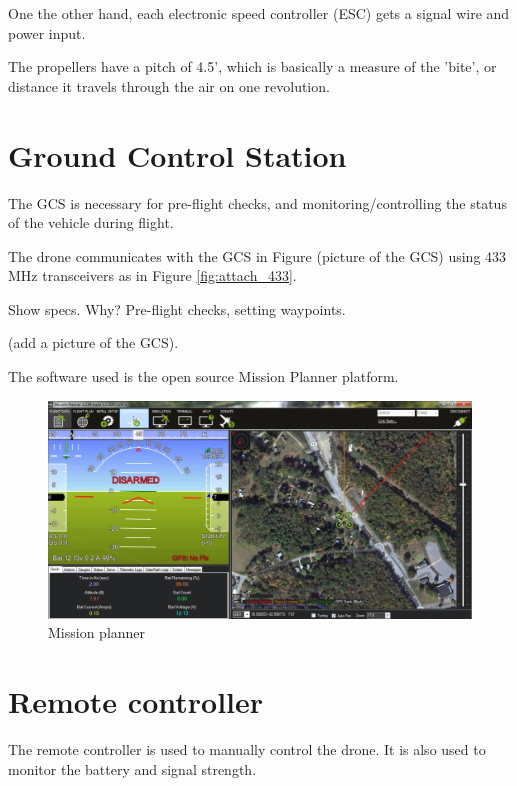 One the other hand, each electronic speed controller (ESC) gets a signal wire and power input.

The propellers have a pitch of 4.5', which is basically a measure of the 'bite', or distance it travels through the air on one revolution.

\section{Ground Control Station}

The GCS is necessary for pre-flight checks, and monitoring/controlling the status of the vehicle during flight.

The drone communicates with the GCS in Figure (picture of the GCS) using 433 MHz transceivers as in Figure \ref{fig:attach_433}.

Show specs. Why? Pre-flight checks, setting waypoints.

(add a picture of the GCS).

The software used is the open source Mission Planner platform.

\begin{figure}[H]
\centering
\includegraphics[scale=0.2]{images/mp.jpg}
\caption{Mission planner}
\label{fig:mission_planner}
\end{figure}

\section{Remote controller}
\label{sec:remote_controller}

The remote controller is used to manually control the drone. It is also used to monitor the battery and signal strength.\\

